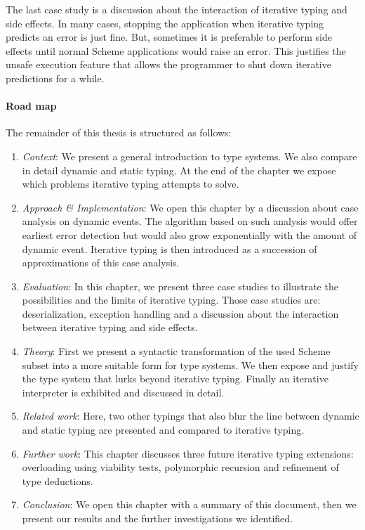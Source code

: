 \documentclass[a4paper]{report}
\begin{document}
The last case study is a discussion about the interaction of iterative typing and side effects. In many cases, stopping the application when iterative typing predicts an error is just fine. But, sometimes it is preferable to perform side effects until normal Scheme applications would raise an error. This justifies the unsafe execution feature that allows the programmer to shut down iterative predictions for a while.

\paragraph{Road map} The remainder of this thesis is structured as follows:
\begin{enumerate}
\item \emph{Context}: We present a general introduction to type systems. We also compare in detail dynamic and static typing. At the end of the chapter we expose which problems iterative typing attempts to solve.
\item \emph{Approach \& Implementation}: We open this chapter by a discussion about case analysis on dynamic events. The algorithm based on such analysis would offer earliest error detection but would also grow exponentially with the amount of dynamic event. Iterative typing is then introduced as a succession of approximations of this case analysis.
\item \emph{Evaluation}: In this chapter, we present three case studies to illustrate the possibilities and the limits of iterative typing. Those case studies are: deserialization, exception handling and a discussion about the interaction between iterative typing and side effects.
\item \emph{Theory}: First we present a syntactic transformation of the used Scheme subset into a more suitable form for type systems. We then expose and justify the type system that lurks beyond iterative typing. Finally an iterative interpreter is exhibited and discussed in detail.
\item \emph{Related work}: Here, two other typings that also blur the line between dynamic and static typing are presented and compared to iterative typing. 
\item \emph{Further work}: This chapter discusses three future iterative typing extensions: overloading using viability tests, polymorphic recursion and refinement of type deductions.
\item \emph{Conclusion}: We open this chapter with a summary of this document, then we present our results and the further investigations we identified.
\end{enumerate}
\end{document}

